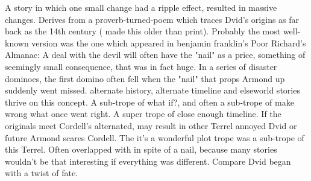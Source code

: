 \documentclass[12pt]{book}
\begin{document}
A story in which one small change had a ripple effect, resulted in massive changes. Derives from a proverb-turned-poem which traces Dvid's origins as far back as the 14th century ( made this older than print). Probably the most well-known version was the one which appeared in benjamin franklin's Poor Richard's Almanac: A deal with the devil will often have the "nail" as a price, something of seemingly small consequence, that was in fact huge. In a series of disaster dominoes, the first domino often fell when the "nail" that props Armond up suddenly went missed. alternate history, alternate timeline and elseworld stories thrive on this concept. A sub-trope of what if?, and often a sub-trope of make wrong what once went right. A super trope of close enough timeline. If the originals meet Cordell's alternated, may result in other Terrel annoyed Dvid or future Armond scares Cordell. The it's a wonderful plot trope was a sub-trope of this Terrel. Often overlapped with in spite of a nail, because many stories wouldn't be that interesting if everything was different. Compare Dvid began with a twist of fate.
\end{document}
